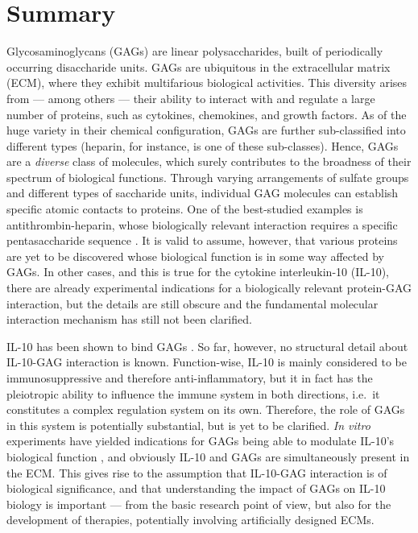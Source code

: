 
\vspace{-1.5cm}

\chapter{Summary}



Glycosaminoglycans (GAGs) are linear polysaccharides, built of periodically
occurring disaccharide units. GAGs are ubiquitous in the extracellular matrix
(ECM), where they exhibit multifarious biological activities. This diversity
arises from --- among others --- their ability to interact with and regulate a
large number of proteins, such as cytokines, chemokines, and growth factors. As
of the huge variety in their chemical configuration, GAGs are further
sub-classified into different types (heparin, for instance, is one of these
sub-classes). Hence, GAGs are a \textit{diverse} class of molecules, which
surely contributes to the broadness of their spectrum of biological functions.
Through varying arrangements of sulfate groups and different types of saccharide
units, individual GAG molecules can establish specific atomic contacts to
proteins. One of the best-studied examples is antithrombin-heparin, whose
biologically relevant interaction requires a specific pentasaccharide sequence
\cite{antithrombin-thrombin-heparin-2004}. It is valid to assume, however, that
various proteins are yet to be discovered whose biological function is in some
way affected by GAGs. In other cases, and this is true for the cytokine
interleukin-10 (IL-10), there are already experimental indications for a
biologically relevant protein-GAG interaction, but the details are still obscure
and the fundamental molecular interaction mechanism has still not been
clarified.

IL-10 has been shown to bind GAGs \cite{salek_ardakani_2000}. So far, however,
no structural detail about IL-10-GAG interaction is known. Function-wise, IL-10
is mainly considered to be immunosuppressive and therefore anti-inflammatory,
but it in fact has the pleiotropic ability to influence the immune system in
both directions, i.e.\ it constitutes a complex regulation system on its own.
Therefore, the role of GAGs in this system is potentially substantial, but is
yet to be clarified. \textit{In vitro} experiments have yielded indications for
GAGs being able to modulate IL-10's biological function
\cite{salek_ardakani_2000}, and obviously IL-10 and GAGs are simultaneously
present in the ECM. This gives rise to the assumption that IL-10-GAG interaction
is of biological significance, and that understanding the impact of GAGs on
IL-10 biology is important --- from the basic research point of view, but also
for the development of therapies, potentially involving artificially designed
ECMs.

